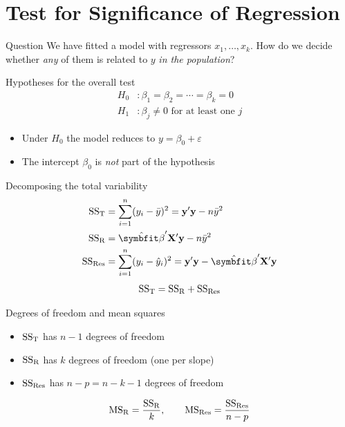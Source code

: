 \section{Test for Significance of Regression}


\begin{frame}{Question}
    We have fitted a model with regressors $x_1,\dots,x_k$. How do we decide whether \emph{any} of them is related to $y$ \emph{in the population}?
\end{frame}


\begin{frame}{Hypotheses for the overall test}
    \begin{align*}
        H_0 &: \beta_1 = \beta_2 = \cdots = \beta_k = 0 \\
        H_1 &: \beta_j \neq 0 \text{ for at least one } j
    \end{align*}
    \begin{itemize}
        \item Under $H_0$ the model reduces to $y = \beta_0 + \varepsilon$
        \item The intercept $\beta_0$ is \emph{not} part of the hypothesis
    \end{itemize}
\end{frame}


\begin{frame}{Decomposing the total variability}
    \begin{align*}
        \SST &= \sum_{i=1}^n (y_i - \bar y)^2 = \by'\by - n\bar y^2 \\
        \SSR &= \hat{\bbeta}'\bX'\by - n\bar y^2 \\
        \SSRes &= \sum_{i=1}^n (y_i - \hat y_i)^2 = \by'\by - \hat{\bbeta}'\bX'\by
    \end{align*}
    \[
        \mathrm{SS}_{\mathrm{T}} = \mathrm{SS}_{\mathrm{R}} + \mathrm{SS}_{\mathrm{Res}}
    \]
\end{frame}


\begin{frame}{Degrees of freedom and mean squares}
    \begin{itemize}
        \item $\mathrm{SS}_{\mathrm{T}}$ has $n-1$ degrees of freedom
        \item $\mathrm{SS}_{\mathrm{R}}$ has $k$ degrees of freedom (one per slope)
        \item $\mathrm{SS}_{\mathrm{Res}}$ has $n-p = n-k-1$ degrees of freedom
    \end{itemize}
    \begin{align*}
        \mathrm{MS}_{\mathrm{R}} = \frac{\mathrm{SS}_{\mathrm{R}}}{k}, \qquad \mathrm{MS}_{\mathrm{Res}} = \frac{\mathrm{SS}_{\mathrm{Res}}}{n-p}
    \end{align*}
\end{frame}


